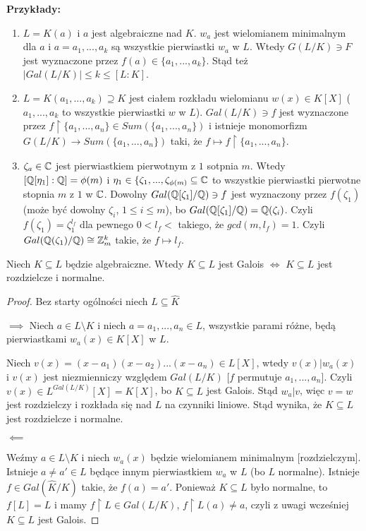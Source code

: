 \textbf{Przykłady:}
\begin{enumerate}
    \item $L=K(a)$ i $a$ jest algebraiczne nad $K$. $w_a$ jest wielomianem minimalnym dla $a$ i $a=a_1,...,a_k$ są wszystkie pierwiastki $w_a$ w $L$. Wtedy $G(L/K)\ni F$ jest wyznaczone przez $f(a)\in \{a_1,...,a_k\}$. Stąd też $|Gal(L/K)|\leq k\leq [L:K]$.
    \item $L=K(a_1,...,a_k)\supseteq K$ jest ciałem rozkładu wielomianu $w(x)\in K[X]$ ($a_1,...,a_k$ to wszystkie pierwiastki $w$ w $L$). $Gal(L/K)\ni f$ jest wyznaczone przez $f\restriction\{a_1,...,a_n\}\in Sum(\{a_1,...,a_n\})$ i istnieje monomorfizm $G(L/K)\to Sum(\{a_1,...,a_n\})$ taki, że $f\mapsto f\restriction\{a_1,...,a_n\}$.
    \item $\zeta_a\in\mathbb{C}$ jest pierwiastkiem pierwotnym z $1$ sotpnia $m$. Wtedy $[\mathbb{Q}[\eta_1]:\mathbb{Q}]=\phi(m)$ i $\eta_1\in\{\zeta_1,...,\zeta_{\phi(m)}\subseteq\mathbb{C}$ to wszystkie pierwiastki pierwotne stopnia $m$ z $1$ w $\mathbb{C}$. Dowolny $Gal(\mathbb{Q}[\zeta_1]/\mathbb{Q})\ni f$ jest wyznaczony przez $f(\zeta_1)$ (może być dowolny $\zeta_i$, $1\leq i\leq m$), bo $Gal(\mathbb{Q}[\zeta_1]/\mathbb{Q})=\mathbb{Q}(\zeta_i)$. Czyli $f(\zeta_1)=\zeta_1^{l_f}$ dla pewnego $0< l_f<$ takiego, że $gcd(m, l_f)=1$. Czyli $Gal(\mathbb{Q}(\zeta_1)/\mathbb{Q})\cong \mathbb{Z}_m^k$ takie, że $f\mapsto l_f$.
\end{enumerate}

\begin{theorem}
Niech $K\subseteq L$ będzie algebraiczne. Wtedy $K\subseteq L$ jest Galois $\iff$ $K\subseteq L$ jest rozdzielcze i normalne.
\end{theorem}
\begin{proof}
Bez starty ogólności niech $L\subseteq\hat{K}$

$\implies$ Niech $a\in L\setminus K$ i niech $a=a_1,...,a_n\in L$, wszystkie parami różne, będą pierwiastkami $w_a(x)\in K[X]$ w $L$.

Niech $v(x)=(x-a_1)(x-a_2)...(x-a_n)\in L[X]$, wtedy $v(x)|w_a(x)$ i $v(x)$ jest niezmienniczy względem $Gal(L/K)$ [$f$ permutuje $a_1,...,a_n$]. Czyli $v(x)\in L^{Gal(L/K)}[X]=K[X]$, bo $K\subseteq L$ jest Galois. Stąd $w_a|v$, więc $v=w$ jest rozdzielczy i rozkłada się nad $L$ na czynniki liniowe. Stąd wynika, że $K\subseteq L$ jest rozdzielcze i normalne.

$\impliedby$

Weźmy $a\in L\setminus K$ i niech $w_a(x)$ będzie wielomianem minimalnym [rozdzielczym]. Istnieje $a\neq a'\in L$ będące innym pierwiastkiem $w_a$ w $L$ (bo $L$ normalne). Istnieje $f\in Gal(\hat{K}/K)$ takie, że $f(a)=a'$. Ponieważ $K\subseteq L$ było normalne, to $f[L]=L$ i mamy $f\restriction L\in Gal(L/K)$, $f\restriction L(a)\neq a$, czyli z uwagi wcześniej $K\subseteq L$ jest Galois.
\end{proof}

